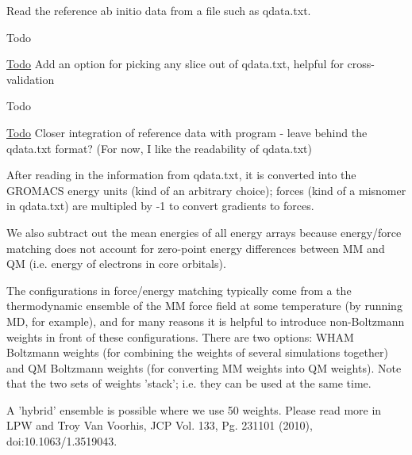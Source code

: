 Read the reference ab initio data from a file such as qdata.\-txt. 

\begin{DoxyRefDesc}{Todo}
\item[\hyperlink{todo__todo000002}{Todo}]Add an option for picking any slice out of qdata.\-txt, helpful for cross-\/validation\end{DoxyRefDesc}


\begin{DoxyRefDesc}{Todo}
\item[\hyperlink{todo__todo000003}{Todo}]Closer integration of reference data with program -\/ leave behind the qdata.\-txt format? (For now, I like the readability of qdata.\-txt)\end{DoxyRefDesc}
\begin{DoxyVerb}     After reading in the information from qdata.txt, it is converted
     into the GROMACS energy units (kind of an arbitrary choice);
     forces (kind of a misnomer in qdata.txt) are multipled by -1
     to convert gradients to forces.

     We also subtract out the mean energies of all energy arrays
     because energy/force matching does not account for zero-point
     energy differences between MM and QM (i.e. energy of electrons
     in core orbitals).

     The configurations in force/energy matching typically come
     from a the thermodynamic ensemble of the MM force field at
     some temperature (by running MD, for example), and for many
     reasons it is helpful to introduce non-Boltzmann weights in
     front of these configurations.  There are two options: WHAM
     Boltzmann weights (for combining the weights of several
     simulations together) and QM Boltzmann weights (for converting
     MM weights into QM weights).  Note that the two sets of weights
     'stack'; i.e. they can be used at the same time.

     A 'hybrid' ensemble is possible where we use 50%
     weights.  Please read more in LPW and Troy Van Voorhis, JCP
     Vol. 133, Pg. 231101 (2010), doi:10.1063/1.3519043.
\end{DoxyVerb}


